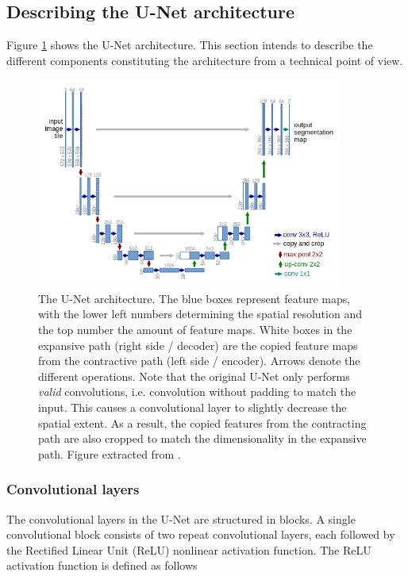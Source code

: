 \documentclass[../main/thesis.tex]{subfiles}
\begin{document}
\subsection{Describing the U-Net architecture}
\label{sec:unet}
Figure \ref{fig:unet-overview} shows the U-Net architecture. This section intends to describe the different components constituting the architecture from a technical point of view. 

\begin{figure}
    \centering
    \includegraphics[width=0.9\textwidth]{unet_screenshot}
    \caption{\label{fig:unet-overview}The U-Net architecture. The blue boxes represent feature maps, with the lower left numbers determining the spatial resolution and the top number the amount of feature maps. White boxes in the expansive path (right side / decoder) are the copied feature maps from the contractive path (left side / encoder). Arrows denote the different operations. Note that the original U-Net only performs \textit{valid} convolutions, i.e. convolution without padding to match the input. This causes a convolutional layer to slightly decrease the spatial extent. As a result, the copied features from the contracting path are also cropped to match the dimensionality in the expansive path. Figure extracted from \protect\citet{Ronneberger2015}.}
\end{figure}

\subsubsection{Convolutional layers}
The convolutional layers in the U-Net are structured in blocks. A single convolutional block consists of two repeat convolutional layers, each followed by the Rectified Linear Unit (ReLU) \citep{Nair2010} nonlinear activation function. The ReLU activation function is defined as follows
\end{document}
